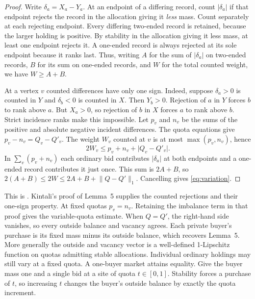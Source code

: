 \documentclass[11pt,letterpaper]{article}
\newcommand{\code}[1]{\textnormal{\texttt{\detokenize{#1}}}}
\newcommand{\baseurl}{https://github.com/robbiemu/bayesian-simple-security-games/blob/75bc25c2ddfac1813064434a3165b3ddd1a1f63d}
\newcommand{\decl}[3]{\href{\baseurl/lean/#1.lean\#L#2}{\code{#3}}}
\newcommand{\abs}[1]{\lvert#1\rvert}
\newcommand{\normone}[1]{\lVert#1\rVert_1}
\begin{document}
\begin{proof}
Write $\delta_a=X_a-Y_a$. At an endpoint of a differing record, count
$|\delta_a|$ if that endpoint rejects the record in the allocation giving
it \emph{less} mass. Count separately at each rejecting endpoint. Every
differing two-ended record is retained, because the larger holding is
positive. By stability in the allocation giving it less mass, at least
one endpoint rejects it. A one-ended record is always rejected at its sole
endpoint because it ranks last. Thus, writing $A$ for the sum of
$|\delta_a|$ on two-ended records, $B$ for its sum on one-ended records,
and $W$ for the total counted weight, we have $W\ge A+B$.

At a vertex $v$ counted differences have only one sign. Indeed, suppose
$\delta_a>0$ is counted in $Y$ and $\delta_b<0$ is counted in $X$.
Then $Y_b>0$. Rejection of $a$ in $Y$ forces $b$ to rank above $a$.
But $X_a>0$, so rejection of $b$ in $X$ forces $a$ to rank above $b$.
Strict incidence ranks make this impossible. Let $p_v$ and $n_v$ be the
sums of the positive and absolute negative incident differences. The quota
equations give $p_v-n_v=Q_v-Q'_v$. The weight $W_v$ counted at $v$ is
at most $\max(p_v,n_v)$, hence
\[
       2W_v\le p_v+n_v+\abs{Q_v-Q'_v}.
\]
In $\sum_v(p_v+n_v)$ each ordinary bid contributes $|\delta_a|$ at both
endpoints and a one-ended record contributes it just once. This sum
is $2A+B$, so
$2(A+B)\le 2W\le 2A+B+\normone{Q-Q'}$. Cancelling gives
\eqref{eq:variation}.
\end{proof}

This is \decl{Kintali/StableAllocation}{192}{Market.slack_variation_le}.
Kintali's proof of Lemma~5 supplies the counted rejections and their
one-sign property. At fixed quotas $p_v=n_v$. Retaining the imbalance
term in that proof gives the variable-quota estimate. When $Q=Q'$, the
right-hand side vanishes, so every outside balance and vacancy agrees.
Each private buyer's purchase is its fixed mass minus its outside balance,
which recovers Lemma~5. More generally the outside and vacancy vector
is a well-defined 1-Lipschitz function on quotas
admitting stable allocations. Individual ordinary holdings may still vary
at a fixed quota. A one-buyer market attains equality. Give the buyer mass
one and a single bid at a site of quota $t\in[0,1]$. Stability forces a
purchase of $t$, so increasing $t$ changes the buyer's outside balance by
exactly the quota increment.
\cite[Lemma~5]{kintali}
\end{document}
